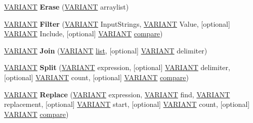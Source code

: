 \begin{DoxyCompactItemize}
\mbox{\label{interface_v_b_script___global_1_1_global_obj_a714356d835caa5dd4fcc6a3072ee71c0}} 
\hyperlink{structtag_v_a_r_i_a_n_t}{V\+A\+R\+I\+A\+NT} {\bfseries Erase} (\hyperlink{structtag_v_a_r_i_a_n_t}{V\+A\+R\+I\+A\+NT} arraylist)
\item 
\mbox{\label{interface_v_b_script___global_1_1_global_obj_a2ebb5aabd92a85f052398d4b5319f277}} 
\hyperlink{structtag_v_a_r_i_a_n_t}{V\+A\+R\+I\+A\+NT} {\bfseries Filter} (\hyperlink{structtag_v_a_r_i_a_n_t}{V\+A\+R\+I\+A\+NT} Input\+Strings, \hyperlink{structtag_v_a_r_i_a_n_t}{V\+A\+R\+I\+A\+NT} Value, \mbox{[}optional\mbox{]} \hyperlink{structtag_v_a_r_i_a_n_t}{V\+A\+R\+I\+A\+NT} Include, \mbox{[}optional\mbox{]} \hyperlink{structtag_v_a_r_i_a_n_t}{V\+A\+R\+I\+A\+NT} \hyperlink{structcompare}{compare})
\item 
\mbox{\label{interface_v_b_script___global_1_1_global_obj_a6a785ea0c8eb3974e116c6a709c99189}} 
\hyperlink{structtag_v_a_r_i_a_n_t}{V\+A\+R\+I\+A\+NT} {\bfseries Join} (\hyperlink{structtag_v_a_r_i_a_n_t}{V\+A\+R\+I\+A\+NT} \hyperlink{classlist}{list}, \mbox{[}optional\mbox{]} \hyperlink{structtag_v_a_r_i_a_n_t}{V\+A\+R\+I\+A\+NT} delimiter)
\item 
\mbox{\label{interface_v_b_script___global_1_1_global_obj_a68ebec417ffb31d53e8db1a48b67d5f0}} 
\hyperlink{structtag_v_a_r_i_a_n_t}{V\+A\+R\+I\+A\+NT} {\bfseries Split} (\hyperlink{structtag_v_a_r_i_a_n_t}{V\+A\+R\+I\+A\+NT} expression, \mbox{[}optional\mbox{]} \hyperlink{structtag_v_a_r_i_a_n_t}{V\+A\+R\+I\+A\+NT} delimiter, \mbox{[}optional\mbox{]} \hyperlink{structtag_v_a_r_i_a_n_t}{V\+A\+R\+I\+A\+NT} count, \mbox{[}optional\mbox{]} \hyperlink{structtag_v_a_r_i_a_n_t}{V\+A\+R\+I\+A\+NT} \hyperlink{structcompare}{compare})
\item 
\mbox{\label{interface_v_b_script___global_1_1_global_obj_a8e545b2e116333607bf2561220726a9b}} 
\hyperlink{structtag_v_a_r_i_a_n_t}{V\+A\+R\+I\+A\+NT} {\bfseries Replace} (\hyperlink{structtag_v_a_r_i_a_n_t}{V\+A\+R\+I\+A\+NT} expression, \hyperlink{structtag_v_a_r_i_a_n_t}{V\+A\+R\+I\+A\+NT} find, \hyperlink{structtag_v_a_r_i_a_n_t}{V\+A\+R\+I\+A\+NT} replacement, \mbox{[}optional\mbox{]} \hyperlink{structtag_v_a_r_i_a_n_t}{V\+A\+R\+I\+A\+NT} start, \mbox{[}optional\mbox{]} \hyperlink{structtag_v_a_r_i_a_n_t}{V\+A\+R\+I\+A\+NT} count, \mbox{[}optional\mbox{]} \hyperlink{structtag_v_a_r_i_a_n_t}{V\+A\+R\+I\+A\+NT} \hyperlink{structcompare}{compare})

\end{DoxyCompactItemize}
